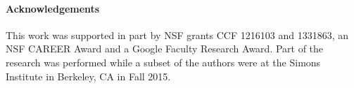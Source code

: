 \paragraph{Acknowledgements} This work was supported in part by NSF grants CCF 1216103 and 1331863, an NSF CAREER Award and a Google Faculty Research Award.  Part of the research was performed while a subset of the authors were at the Simons Institute in Berkeley, CA in Fall 2015.  %

